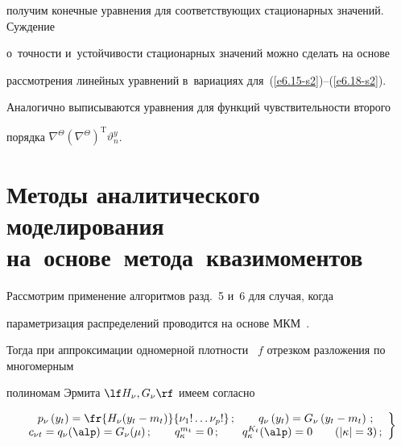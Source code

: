 получим конечные уравнения для соответствующих стационарных значений. Суждение 

о~точ\-ности и~устойчивости стационарных значений можно сделать на основе 

рас\-смот\-ре\-ния линейных уравнений в~вариациях для~(\ref{e6.15-s2})--(\ref{e6.18-s2}).

Аналогично выписываются уравнения для функций чувствительности второго 

порядка $\nabla^\Theta (\nabla^\Theta)^{\mathrm{T}} \vartheta_n^y$.







\section{Методы аналитического моделирования на~основе~метода~квазимоментов}





Рассмотрим применение алгоритмов разд.~5 и~6 для случая, когда 

параметризация распределений проводится на основе МКМ~\cite{9-s2, 10-s2}.

Тогда при аппроксимации одномерной плот\-ности~ $f$ отрезком разложения по многомерным 

полиномам Эрмита $\lf H_\nu , G_\nu\rf$ имеем согласно~\cite{1-s2, 2-s2}

  \begin{equation}

  \left.

  \begin{array}{c}

    p_\nu \left(y_t\right) = \fr{H_\nu (y_t-m_t)}{\nu_1 ! \ldots \nu_p !}\,;\qquad 

    q_\nu \left(y_t \right)= G_\nu \left(y_t-m_t\right)\,;\\ 

    c_{\nu t} = q_\nu (\alp) = G_\nu(\mu)\,;

    \qquad

    q_\kappa^{m_t} =0\,;\qquad q_\kappa^{K_t} (\alp)=0 \qquad ( | \kappa |=3)\,;

\end{array}

    \right\}

    \label{e7.1-s2}

    \end{equation}



